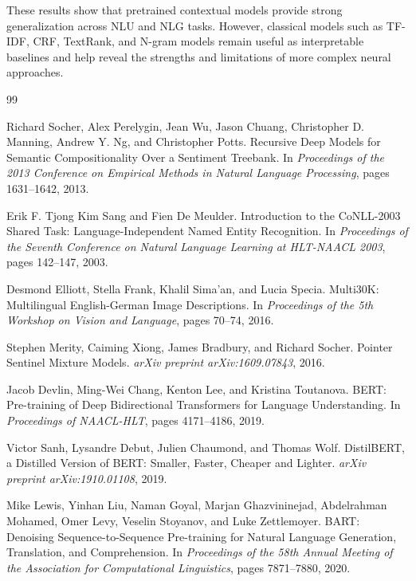 \documentclass[11pt,a4paper]{article}
\begin{document}
These results show that pretrained contextual models provide strong generalization across NLU and NLG tasks. However, classical models such as TF-IDF, CRF, TextRank, and N-gram models remain useful as interpretable baselines and help reveal the strengths and limitations of more complex neural approaches.

\begin{thebibliography}{99}

Richard Socher, Alex Perelygin, Jean Wu, Jason Chuang, Christopher D. Manning, Andrew Y. Ng, and Christopher Potts.
\newblock Recursive Deep Models for Semantic Compositionality Over a Sentiment Treebank.
\newblock In \emph{Proceedings of the 2013 Conference on Empirical Methods in Natural Language Processing}, pages 1631--1642, 2013.

Erik F. Tjong Kim Sang and Fien De Meulder.
\newblock Introduction to the CoNLL-2003 Shared Task: Language-Independent Named Entity Recognition.
\newblock In \emph{Proceedings of the Seventh Conference on Natural Language Learning at HLT-NAACL 2003}, pages 142--147, 2003.

Desmond Elliott, Stella Frank, Khalil Sima'an, and Lucia Specia.
\newblock Multi30K: Multilingual English-German Image Descriptions.
\newblock In \emph{Proceedings of the 5th Workshop on Vision and Language}, pages 70--74, 2016.

Stephen Merity, Caiming Xiong, James Bradbury, and Richard Socher.
\newblock Pointer Sentinel Mixture Models.
\newblock \emph{arXiv preprint arXiv:1609.07843}, 2016.

Jacob Devlin, Ming-Wei Chang, Kenton Lee, and Kristina Toutanova.
\newblock BERT: Pre-training of Deep Bidirectional Transformers for Language Understanding.
\newblock In \emph{Proceedings of NAACL-HLT}, pages 4171--4186, 2019.

Victor Sanh, Lysandre Debut, Julien Chaumond, and Thomas Wolf.
\newblock DistilBERT, a Distilled Version of BERT: Smaller, Faster, Cheaper and Lighter.
\newblock \emph{arXiv preprint arXiv:1910.01108}, 2019.

Mike Lewis, Yinhan Liu, Naman Goyal, Marjan Ghazvininejad, Abdelrahman Mohamed, Omer Levy, Veselin Stoyanov, and Luke Zettlemoyer.
\newblock BART: Denoising Sequence-to-Sequence Pre-training for Natural Language Generation, Translation, and Comprehension.
\newblock In \emph{Proceedings of the 58th Annual Meeting of the Association for Computational Linguistics}, pages 7871--7880, 2020.


\end{thebibliography}
\end{document}
